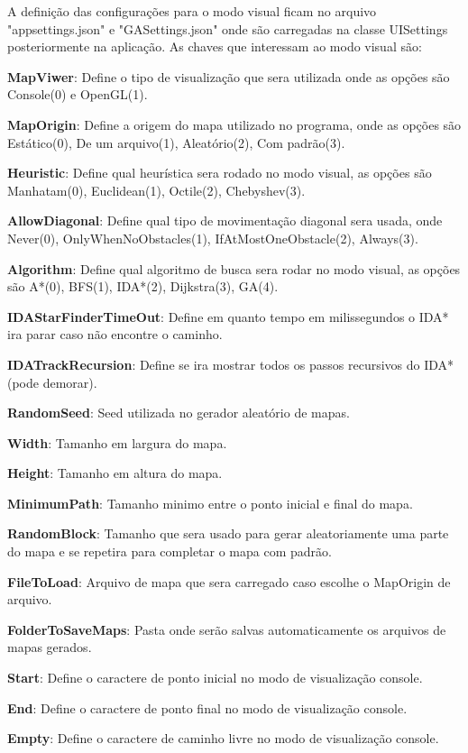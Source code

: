 A definição das configurações para o modo visual ficam no arquivo "appsettings.json" e "GASettings.json" onde são carregadas na classe UISettings posteriormente na aplicação. As chaves que interessam ao modo visual são:


\textbf{MapViwer}: Define o tipo de visualização que sera utilizada onde as opções são Console(0) e OpenGL(1).

\textbf{MapOrigin}: Define a origem do mapa utilizado no programa, onde as opções são Estático(0), De um arquivo(1), Aleatório(2), Com padrão(3).

\textbf{Heuristic}: Define qual heurística sera rodado no modo visual, as opções são Manhatam(0), Euclidean(1), Octile(2), Chebyshev(3).

\textbf{AllowDiagonal}: Define qual tipo de movimentação diagonal sera usada, onde Never(0), OnlyWhenNoObstacles(1), IfAtMostOneObstacle(2), Always(3).

\textbf{Algorithm}: Define qual algoritmo de busca sera rodar no modo visual, as opções são  A\**(0), BFS(1), IDA\**(2), Dijkstra(3), GA(4).
 
\textbf{IDAStarFinderTimeOut}: Define em quanto tempo em milissegundos o IDA\** ira parar caso não encontre o caminho.

\textbf{IDATrackRecursion}: Define se ira mostrar todos os passos recursivos do IDA\** (pode demorar).
 
\textbf{RandomSeed}: Seed utilizada no gerador aleatório de mapas.

\textbf{Width}: Tamanho em largura do mapa.

\textbf{Height}: Tamanho em altura do mapa.

\textbf{MinimumPath}: Tamanho minimo entre o ponto inicial e final do mapa.

\textbf{RandomBlock}: Tamanho que sera usado para gerar aleatoriamente uma parte do mapa e se repetira para completar o mapa com padrão.

\textbf{FileToLoad}: Arquivo de mapa que sera carregado caso escolhe o MapOrigin de arquivo.

\textbf{FolderToSaveMaps}: Pasta onde serão salvas automaticamente os arquivos de mapas gerados.

\textbf{Start}: Define o caractere de ponto inicial no modo de visualização console.

\textbf{End}: Define o caractere de ponto final no modo de visualização console.

\textbf{Empty}: Define o caractere de caminho livre no modo de visualização console.

